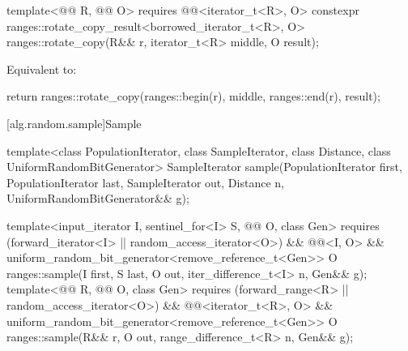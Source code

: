 \begin{itemdecl}
template<@@ R, @@ O>
  requires @@<iterator_t<R>, O>
  constexpr ranges::rotate_copy_result<borrowed_iterator_t<R>, O>
    ranges::rotate_copy(R&& r, iterator_t<R> middle, O result);
\end{itemdecl}

\begin{itemdescr}
\pnum
\effects
Equivalent to:
\begin{codeblock}
return ranges::rotate_copy(ranges::begin(r), middle, ranges::end(r), result);
\end{codeblock}
\end{itemdescr}

[alg.random.sample]{Sample}

%
\begin{itemdecl}
template<class PopulationIterator, class SampleIterator,
         class Distance, class UniformRandomBitGenerator>
  SampleIterator sample(PopulationIterator first, PopulationIterator last,
                        SampleIterator out, Distance n,
                        UniformRandomBitGenerator&& g);

template<input_iterator I, sentinel_for<I> S, @@ O, class Gen>
  requires (forward_iterator<I> || random_access_iterator<O>) &&
           @@<I, O> &&
           uniform_random_bit_generator<remove_reference_t<Gen>>
  O ranges::sample(I first, S last, O out, iter_difference_t<I> n, Gen&& g);
template<@@ R, @@ O, class Gen>
  requires (forward_range<R> || random_access_iterator<O>) &&
           @@<iterator_t<R>, O> &&
           uniform_random_bit_generator<remove_reference_t<Gen>>
  O ranges::sample(R&& r, O out, range_difference_t<R> n, Gen&& g);
\end{itemdecl}

